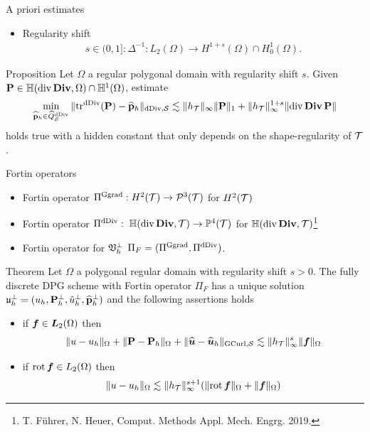 \documentclass[10pt]{beamer}
\begin{document}
\begin{frame}{A priori estimates}
\begin{itemize}
    \item Regularity shift 
    \begin{align*}
        s \in (0,1]: \Delta^{-1}: L_2(\Omega) \to H^{1+s}(\Omega) \cap H^1_0(\Omega).
    \end{align*}
\end{itemize}
\begin{block}{Proposition} Let $\Omega$ a regular polygonal domain with regularity shift $s$. Given $\mathbf{P} \in {\ensuremath{\mathbb{H}}({{\rm div\,}{\rm\bf Div\,}\!},\Omega)}\cap \mathbb{H}^1(\Omega)$, estimate
\begin{align*}
   \min_{\widehat{\mathbf{p}}_h \in \widehat{Q}^{\mathrm{dDiv}}_{\mathcal{S}}}
   \|\mathrm{tr}_{}^{\mathrm{dDiv}}(\mathbf{P}) - \widehat{\mathbf{p}}_h\|_{\mathrm{dDiv},\mathcal{S}}
   \lesssim \|h_{\mathcal{T}}\|_\infty \|\mathbf{P}\|_1 + \|h_{\mathcal{T}}\|_\infty^{1+s} \|{\rm div\,}{\rm\bf Div\,}\mathbf{P}\|
\end{align*}  
holds true with a hidden constant that only depends on the shape-regularity of $\mathcal{T}$.
\end{block}
\end{frame}
\begin{frame}{Fortin operators}
    \begin{itemize}
        \item Fortin operator $\Pi^{\mathrm{Ggrad}}:H^2(\mathcal{T}) \to \mathcal{P}^3(\mathcal{T})$  for $H^2(\mathcal{T})$
        \item Fortin operator $\Pi^{\mathrm{dDiv}}:\;{\mathbb{H}({{\rm div\,}{\rm\bf Div\,}\!},\mathcal{T})}\to \mathbb{P}^{4}(\mathcal{T})$ for ${\mathbb{H}({{\rm div\,}{\rm\bf Div\,}\!},\mathcal{T})}$\footnote[1]{T. F\"uhrer, N. Heuer, Comput. Methods Appl. Mech. Engrg. 2019.  }
        \item Fortin operator for $\mathfrak{V}^\perp_h$ $\Pi_F =(\Pi^{\mathrm{Ggrad}},\Pi^{\mathrm{dDiv}})$.
    \end{itemize}
    \begin{block}{Theorem} Let $\Omega$ a polygonal regular domain  with regularity shift $s>0$. The fully discrete DPG scheme with Fortin operator $\Pi_F$ has a unique solution $\mathfrak{u}_h^\perp = (u_h,\mathbf{P}^\perp_h,{\hat u}^\perp_h,\widehat{\mathbf{p}}^\perp_h)$ and the following assertions holds
    \begin{itemize}
        \item[a)] if $\boldsymbol{f} \in \boldsymbol{L}_2(\Omega)$ then 
        \begin{align*}
            \|u-u_h\|_{\Omega}+\|\mathbf{P}-\mathbf{P}_h\|_{\Omega}+\|\widehat{\boldsymbol{u}}-\widehat{\boldsymbol{u}}_h\|_{\mathrm{GCurl},\mathcal{S}} \lesssim \|h_{\mathcal{T}}\|_{\infty}^s\|\boldsymbol{f}\|_\Omega 
        \end{align*}
        \item[b)] if ${\rm rot\,} \boldsymbol{f} \in L_2(\Omega)$ then 
        \begin{align*}
            \|u-u_h\|_{\Omega} \lesssim \|h_{\mathcal{T}}\|_{\infty}^{s+1} (\|{\rm rot\,} \boldsymbol{f}\|_{\Omega} +\|\boldsymbol{f}\|_{\Omega})
        \end{align*}
    \end{itemize}
        
    \end{block}
\end{frame}
\end{document}
